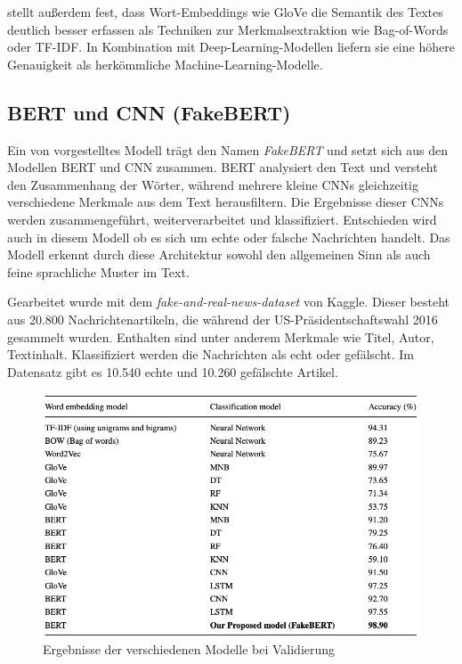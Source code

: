 \cite{Buddhadev2025} stellt außerdem fest, dass Wort-Embeddings wie GloVe die Semantik des Textes deutlich besser erfassen als Techniken zur Merkmalsextraktion 
wie Bag-of-Words oder TF-IDF. In Kombination mit Deep-Learning-Modellen liefern sie eine höhere Genauigkeit als herkömmliche Machine-Learning-Modelle.

\subsection{BERT und CNN (FakeBERT)}
\label{sec:fakebert}

Ein von \cite{Kaliyar:2021aa} vorgestelltes Modell trägt den Namen \textit{FakeBERT} und setzt sich aus den Modellen BERT und CNN zusammen.
BERT analysiert den Text und versteht den 
Zusammenhang der Wörter, während mehrere kleine CNNs gleichzeitig verschiedene Merkmale aus dem Text herausfiltern. Die Ergebnisse dieser 
CNNs werden zusammengeführt, weiterverarbeitet und klassifiziert. Entschieden wird auch in diesem Modell ob es sich um echte oder falsche 
Nachrichten handelt. Das Modell erkennt durch diese Architektur sowohl den allgemeinen Sinn als auch feine sprachliche Muster im Text.

Gearbeitet wurde mit dem \textit{fake-and-real-news-dataset} von Kaggle. Dieser besteht aus 20.800 Nachrichtenartikeln, die während der US-Präsidentschaftswahl 2016 gesammelt wurden. 
Enthalten sind unter anderem Merkmale wie Titel, Autor, Textinhalt. Klassifiziert werden die Nachrichten als echt oder gefälscht. 
Im Datensatz gibt es 10.540 echte und 10.260 gefälschte Artikel.

\begin{figure}[htbp]
    \begin{center}
    \includegraphics[scale=0.5]{static/bert_cnn_fakebert.png}
    \caption{\label{fig:bert_cnn_fakebert} Ergebnisse der verschiedenen Modelle bei Validierung \cite{Kaliyar:2021aa}}
    \end{center}
\end{figure}

